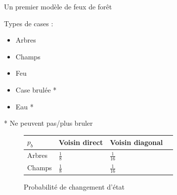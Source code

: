 \documentclass{beamer}
\begin{document}
\begin{frame}{Un premier modèle de feux de forêt \hyperlink{jump}{\beamerbutton{ }} \hypertarget{5}{\beamerbutton{ }}}
    \begin{block}{Types de cases :}
        \begin{itemize}
            \item Arbres
            \item Champs
            \item Feu
            \item Case brulée *
            \item Eau *
        \end{itemize}

        * Ne peuvent pas/plus bruler
    \end{block}

    \begin{figure}
        \begin{center}
            \renewcommand{\arraystretch}{2}
            \setlength{\extrarowheight}{-3pt}
            \begin{table}
                \begin{tabular}{ |C{2cm}|L{3cm}|C{3cm}|N }
                \hline
                $p_{b}$ & Voisin direct & Voisin diagonal \\
                \hline 
                Arbres & \centering $\tfrac{1}{8}$ & $\tfrac{1}{16}$ \\ 
                \hline
                Champs & \centering $\tfrac{1}{8}$ & $\tfrac{1}{16}$ \\
                \hline 
                \end{tabular}
            \end{table}
        \end{center}
        \caption{Probabilité de changement d'état}
    \end{figure}
\end{frame}
\end{document}
